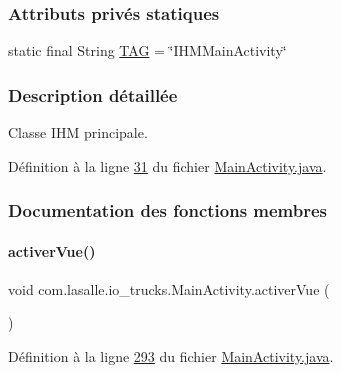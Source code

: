 \subsubsection*{Attributs privés statiques}
\begin{DoxyCompactItemize}
\item 
static final String \hyperlink{classcom_1_1lasalle_1_1io__trucks_1_1_main_activity_a37b90dba972711328e3f4c83c55eb0fc}{T\+AG} = \char`\"{}I\+H\+M\+Main\+Activity\char`\"{}
\end{DoxyCompactItemize}


\subsubsection{Description détaillée}
Classe I\+HM principale. 

Définition à la ligne \hyperlink{_main_activity_8java_source_l00031}{31} du fichier \hyperlink{_main_activity_8java_source}{Main\+Activity.\+java}.



\subsubsection{Documentation des fonctions membres}
\mbox{\label{classcom_1_1lasalle_1_1io__trucks_1_1_main_activity_a09f9deded45d212d479d2206ddf52749}} 
\paragraph{\texorpdfstring{activer\+Vue()}{activerVue()}}
{\footnotesize\ttfamily void com.\+lasalle.\+io\+\_\+trucks.\+Main\+Activity.\+activer\+Vue (\begin{DoxyParamCaption}{ }\end{DoxyParamCaption})\hspace{0.3cm}{\ttfamily [private]}}



Définition à la ligne \hyperlink{_main_activity_8java_source_l00293}{293} du fichier \hyperlink{_main_activity_8java_source}{Main\+Activity.\+java}.


